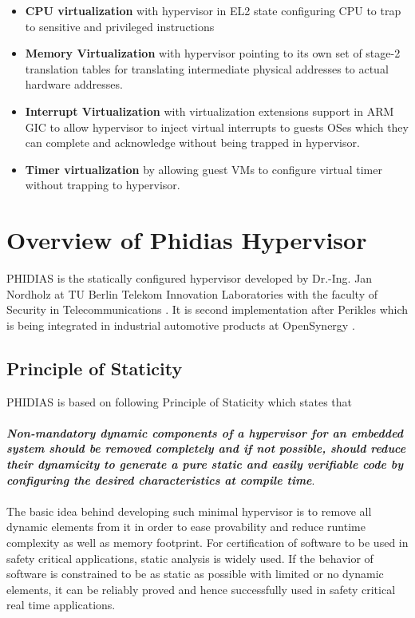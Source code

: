 \begin{itemize}
	\item \textbf{CPU virtualization} with hypervisor in EL2 state configuring CPU to trap to sensitive and privileged instructions
	\item \textbf{Memory Virtualization} with hypervisor pointing to its own set of stage-2 translation tables for translating intermediate physical addresses to actual hardware addresses.
	\item \textbf{Interrupt Virtualization} with virtualization extensions support in ARM GIC to allow hypervisor to inject virtual interrupts to guests OSes which they can complete and acknowledge without being trapped in hypervisor.
	\item \textbf{Timer virtualization} by allowing guest VMs to configure virtual timer without trapping to hypervisor.
\end{itemize}

\section{Overview of Phidias Hypervisor \label{sec:summ}}
PHIDIAS is the statically configured hypervisor developed by Dr.-Ing. Jan Nordholz at TU Berlin Telekom Innovation Laboratories with the faculty of Security in Telecommunications \cite{Jan}. It is second implementation after Perikles which is being integrated in industrial automotive products at OpenSynergy \cite{opensynergy}.
\subsection{Principle of Staticity}
PHIDIAS is based on following Principle of Staticity which states that \\
\\
\textbf{\textit{Non-mandatory dynamic components of a hypervisor for an embedded system should be removed completely and if not possible, should reduce their dynamicity to generate a pure static and easily verifiable code by configuring the desired characteristics at compile time}}.\\
\\
The basic idea behind developing such minimal hypervisor is to remove all dynamic elements from it in order to ease provability and reduce runtime complexity as well as memory footprint. For certification of software to be used in safety critical applications, static analysis is widely used. If the behavior of software is constrained to be as static as possible with limited or no dynamic elements, it can be reliably proved and hence successfully used in safety critical real time applications.

